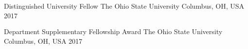 



\begin{cvhonors}

  \cvhonor
    {Distinguished University Fellow} %
    {The Ohio State University} %
    {Columbus, OH, USA} %
    {2017} %

  \cvhonor
    {Department Supplementary Fellowship Award} %
    {The Ohio State University} %
    {Columbus, OH, USA} %
    {2017} %

\end{cvhonors}




